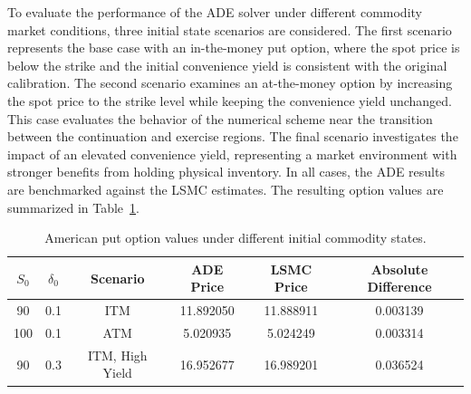 \documentclass[12pt,a4paper]{article}
\begin{document}
To evaluate the performance of the ADE solver under different commodity market conditions, three initial state scenarios are considered. The first scenario represents the base case with an in-the-money put option, where the spot price is below the strike and the initial convenience yield is consistent with the original calibration. The second scenario examines an at-the-money option by increasing the spot price to the strike level while keeping the convenience yield unchanged. This case evaluates the behavior of the numerical scheme near the transition between the continuation and exercise regions. The final scenario investigates the impact of an elevated convenience yield, representing a market environment with stronger benefits from holding physical inventory. In all cases, the ADE results are benchmarked against the LSMC estimates. The resulting option values are summarized in Table~\ref{tab:Table2}.

\begin{table}[h!]
\centering
\caption{American put option values under different initial commodity states.}
\label{tab:Table2}
\begin{tabular}{cccccc}
\hline
$S_0$ & $\delta_0$ & Scenario & ADE Price & LSMC Price & Absolute Difference \\
\hline
90  & 0.1 & ITM & 11.892050 & 11.888911 & 0.003139 \\
100 & 0.1 & ATM & 5.020935  & 5.024249  & 0.003314 \\
90  & 0.3 & ITM, High Yield & 16.952677 & 16.989201 & 0.036524 \\
\hline
\end{tabular}
\end{table}
\end{document}
